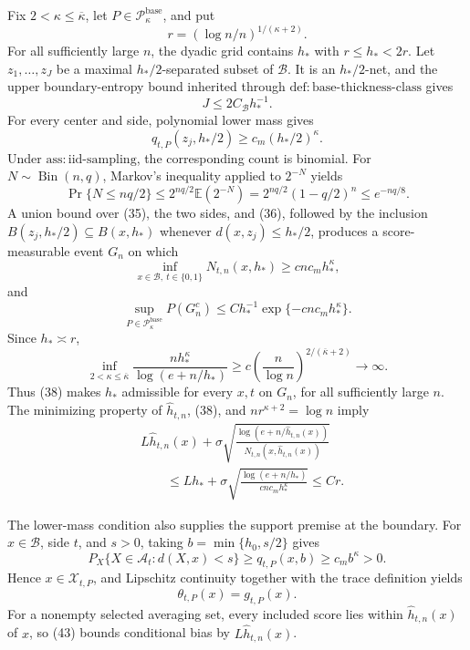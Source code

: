 Fix \(2<\kappa\le\overline\kappa\), let
\(P\in\mathcal P_{\kappa}^{\mathrm{base}}\), and put
\[
 r=(\log n/n)^{1/(\kappa+2)}.
\]
For all sufficiently large \(n\), the dyadic grid contains \(h_*\) with
\(r\le h_*<2r\).  Let \(z_1,\ldots,z_J\) be a maximal
\(h_*/2\)-separated subset of \(\mathcal B\).  It is an
\(h_*/2\)-net, and the upper boundary-entropy bound inherited through
\(\mathrm{def:base\text{-}thickness\text{-}class}\) gives
\[
 J\le2C_{\mathcal B}h_*^{-1}.
 \tag{35}
\]
For every center and side, polynomial lower mass gives
\[
 q_{t,P}(z_j,h_*/2)\ge c_m(h_*/2)^\kappa.
 \tag{36}
\]
Under \(\mathrm{ass:iid\text{-}sampling}\), the corresponding count is
binomial.  For \(N\sim\operatorname{Bin}(n,q)\), Markov's inequality
applied to \(2^{-N}\) yields
\[
 \Pr\{N\le nq/2\}
 \le2^{nq/2}\mathbb E(2^{-N})
 =2^{nq/2}(1-q/2)^n
 \le e^{-nq/8}.
 \tag{37}
\]
A union bound over (35), the two sides, and (36), followed by the inclusion
\(B(z_j,h_*/2)\subseteq B(x,h_*)\) whenever
\(d(x,z_j)\le h_*/2\), produces a score-measurable event \(G_n\) on
which
\[
 \inf_{x\in\mathcal B,\ t\in\{0,1\}}N_{t,n}(x,h_*)
 \ge c n c_mh_*^\kappa,
 \tag{38}
\]
and
\[
 \sup_{P\in\mathcal P_{\kappa}^{\mathrm{base}}}P(G_n^c)
 \le Ch_*^{-1}\exp\{-c n c_mh_*^\kappa\}.
 \tag{39}
\]
Since \(h_*\asymp r\),
\[
 \inf_{2<\kappa\le\overline\kappa}
 \frac{nh_*^\kappa}{\log(e+n/h_*)}
 \ge c\left(\frac n{\log n}\right)^{2/(\overline\kappa+2)}
 \longrightarrow\infty.
 \tag{40}
\]
Thus (38) makes \(h_*\) admissible for every \(x,t\) on \(G_n\), for
all sufficiently large \(n\).  The minimizing property of
\(\widehat h_{t,n}\), (38), and \(nr^{\kappa+2}=\log n\) imply
\[
 \begin{aligned}
 &L\widehat h_{t,n}(x)
 +\sigma\sqrt{\frac{\log(e+n/\widehat h_{t,n}(x))}
 {N_{t,n}(x,\widehat h_{t,n}(x))}}\\
 &\qquad\le Lh_*+
 \sigma\sqrt{\frac{\log(e+n/h_*)}{c n c_mh_*^\kappa}}
 \le Cr.
 \end{aligned}
 \tag{41}
\]

The lower-mass condition also supplies the support premise at the
boundary.  For \(x\in\mathcal B\), side \(t\), and \(s>0\), taking
\(b=\min\{h_0,s/2\}\) gives
\[
 P_X\{X\in\mathcal A_t:d(X,x)<s\}
 \ge q_{t,P}(x,b)\ge c_mb^\kappa>0.
 \tag{42}
\]
Hence \(x\in\mathcal X_{t,P}\), and Lipschitz continuity together with
the trace definition yields
\[
 \theta_{t,P}(x)=g_{t,P}(x).
 \tag{43}
\]
For a nonempty selected averaging set, every included score lies within
\(\widehat h_{t,n}(x)\) of \(x\), so (43) bounds conditional bias by
\(L\widehat h_{t,n}(x)\).

